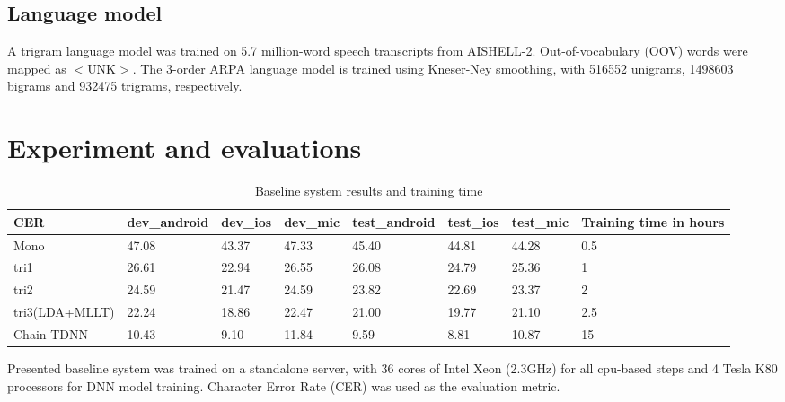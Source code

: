 \documentclass[a4paper]{article}
\begin{document}
\subsection{Language model}

A trigram language model was trained on 5.7 million-word speech transcripts from AISHELL-2. Out-of-vocabulary (OOV) words were mapped as $<$UNK$>$. The 3-order ARPA language model is trained using Kneser-Ney smoothing, with 516552 unigrams, 1498603 bigrams and 932475 trigrams, respectively.

\section{Experiment and evaluations}

\begin{table}[tp]
  \caption{Baseline system results and training time}
  \label{tab:base}
  \centering
  \begin{tabular}{ llllllll }
    \toprule
    CER               &  dev\_android           &  dev\_ios           &  dev\_mic           & test\_android            &  test\_ios           &  test\_mic          &  Training time in hours         \\
    \midrule
    Mono        &  47.08                 &  43.37             &  47.33             &  45.40                  &  44.81              &  44.28             &  0.5                   \\
    tri1    &  26.61                 &  22.94             &  26.55             &  26.08                  &  24.79              &  25.36             &  1                     \\
    tri2    &  24.59                 &  21.47             &  24.59             &  23.82                 &  22.69              &  23.37             &  2                     \\
    tri3(LDA+MLLT)          &  22.24                 &  18.86             &  22.47             &  21.00                  &  19.77              &  21.10             &  2.5                   \\
    Chain-TDNN              &  10.43                 &  9.10             &  11.84         &  9.59                  &  8.81             &  10.87              &  15                    \\
    \bottomrule
  \end{tabular}
\end{table}

Presented baseline system was trained on a standalone server, with 36 cores of Intel Xeon (2.3GHz) for all cpu-based steps and 4
Tesla K80 processors for DNN model training. Character Error Rate (CER) was used as the evaluation metric.
\end{document}
